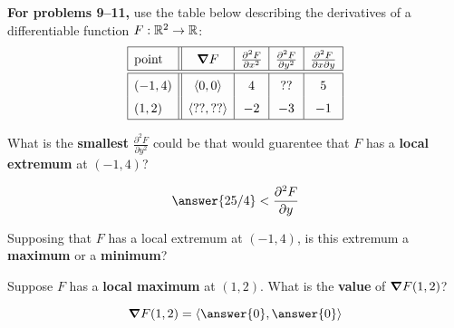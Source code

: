\documentclass{ximera}
\author{Bart Snapp}
\begin{document}
\textbf{For problems 9--11,} use the table below describing the
derivatives of a differentiable function $F:\mathbb R^2\to\mathbb R$:
\[\def\arraystretch{1.5}
\begin{array}{|l||c|c|c|c|}\hline
  \text{point} & \grad F          & \frac{\partial^2 F}{\partial x^2} & \frac{\partial^2 F}{\partial y^2}  & \frac{\partial^2 F}{\partial x\partial y}\\\hline\hline
  (-1,4)        & \vector{0,0}     &        4                        &             ??              &  5 \\
  (1,2)        & \vector{??,??}   &        -2                       &            -3                &  -1 \\
  \hline
\end{array}
\]
\begin{problem}
  What is the \textbf{smallest} $\frac{\partial^2 F}{\partial y^2}$
  could be that would guarentee that $F$ has a \textbf{local extremum} at
  $(-1,4)$?
  \begin{prompt}
    \[
    \answer{25/4}<\frac{\partial^2 F}{\partial y}
    \]
  \end{prompt}
  \vfill
\end{problem}

\begin{problem}
  Supposing that $F$ has a local extremum at $(-1,4)$, is this extremum a \textbf{maximum} or a \textbf{minimum}?
  \begin{prompt}
    \begin{multipleChoice}
    \end{multipleChoice}
  \end{prompt}
  \vfill
\end{problem}


\begin{problem}
  Suppose $F$ has a \textbf{local maximum} at $(1,2)$. What is the \textbf{value} of $\boldsymbol\nabla F(1,2)$?
  \begin{prompt}
    \[
    \grad F(1,2) = \vector{\answer{0},\answer{0}}
    \]
  \end{prompt}
\vfill
\end{problem}


\end{document}
